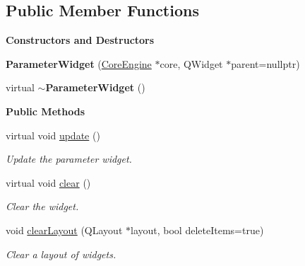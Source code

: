 \subsection*{Public Member Functions}
\begin{Indent}\textbf{ Constructors and Destructors}\par
\begin{DoxyCompactItemize}
\item 
\mbox{\label{classrev_1_1_view_1_1_parameter_widget_a7ba59c33236176f991074d7d6d756b74}} 
{\bfseries Parameter\+Widget} (\mbox{\hyperlink{classrev_1_1_core_engine}{Core\+Engine}} $\ast$core, Q\+Widget $\ast$parent=nullptr)
\item 
\mbox{\label{classrev_1_1_view_1_1_parameter_widget_a031d235ac20509773766da55e552317c}} 
virtual {\bfseries $\sim$\+Parameter\+Widget} ()
\end{DoxyCompactItemize}
\end{Indent}
\begin{Indent}\textbf{ Public Methods}\par
\begin{DoxyCompactItemize}
\item 
\mbox{\label{classrev_1_1_view_1_1_parameter_widget_a9f10edc769c0068dbe07c24fbdd81bed}} 
virtual void \mbox{\hyperlink{classrev_1_1_view_1_1_parameter_widget_a9f10edc769c0068dbe07c24fbdd81bed}{update}} ()
\begin{DoxyCompactList}\small\item\em Update the parameter widget. \end{DoxyCompactList}\item 
\mbox{\label{classrev_1_1_view_1_1_parameter_widget_a7244fc3921c2178cc81839986e851249}} 
virtual void \mbox{\hyperlink{classrev_1_1_view_1_1_parameter_widget_a7244fc3921c2178cc81839986e851249}{clear}} ()
\begin{DoxyCompactList}\small\item\em Clear the widget. \end{DoxyCompactList}\item 
\mbox{\label{classrev_1_1_view_1_1_parameter_widget_a15baa013b38b3dc0af630ade2db84cb2}} 
void \mbox{\hyperlink{classrev_1_1_view_1_1_parameter_widget_a15baa013b38b3dc0af630ade2db84cb2}{clear\+Layout}} (Q\+Layout $\ast$layout, bool delete\+Items=true)
\begin{DoxyCompactList}\small\item\em Clear a layout of widgets. \end{DoxyCompactList}\end{DoxyCompactItemize}
\end{Indent}
